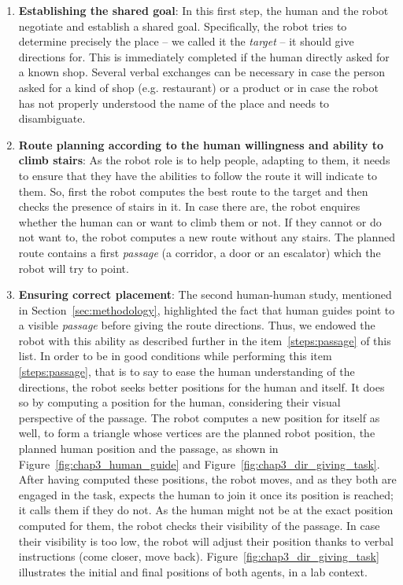 \documentclass[a4paper,11pt,twoside]{StyleThese}
\begin{document}
\begin{enumerate}
	\item \textbf{Establishing the shared goal}: In this first step, the human and the robot negotiate and establish a shared goal. Specifically, the robot tries to determine precisely the place -- we called it the \textit{target} -- it should give directions for. This is immediately completed if the human directly asked for a known shop. Several verbal exchanges can be necessary in case the person asked for a kind of shop (e.g. restaurant) or a product or in case the robot has not properly understood the name of the place and needs to disambiguate.
	\item \textbf{Route planning according to the human willingness and ability to climb stairs}: As the robot role is to help people, adapting to them, it needs to ensure that they have the abilities to follow the route it will indicate to them. So, first the robot computes the best route to the target and then checks the presence of stairs in it. In case there are, the robot enquires whether the human can or want to climb them or not. If they cannot or do not want to, the robot computes a new route without any stairs. The planned route contains a first  \textit{passage} (\ie a corridor, a door or an escalator) which the robot will try to point.
	\item \textbf{Ensuring correct placement}: The second human-human study, mentioned in Section~\ref{sec:methodology}, highlighted the fact that human guides point to a visible \textit{passage} before giving the route directions. Thus, we endowed the robot with this ability as described further in the item~\ref{steps:passage} of this list. In order to be in good conditions while performing this item \ref{steps:passage}, that is to say to ease the human understanding of the directions, the robot seeks better positions for the human and itself. It does so by computing a position for the human, considering their visual perspective of the passage.
	The robot computes a new position for itself as well, to form a triangle whose vertices are the planned robot position, the planned human position and the passage, as shown in Figure~\ref{fig:chap3_human_guide} and Figure~\ref{fig:chap3_dir_giving_task}. After having computed these positions, the robot moves, and as they both are engaged in the task, expects the human to join it once its position is reached; it calls them if they do not. As the human might not be at the exact position computed for them, the robot checks their visibility of the passage. In case their visibility is too low, the robot will adjust their position thanks to verbal instructions (\ie come closer, move back). Figure~\ref{fig:chap3_dir_giving_task} illustrates the initial and final positions of both agents, in a lab context. 

\end{enumerate}
\end{document}
